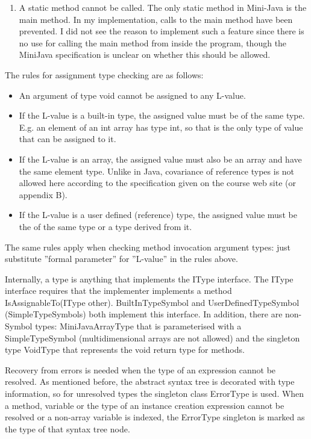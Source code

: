 \documentclass[a4paper,11pt]{article}
\begin{document}
\begin{enumerate}
\item A static method cannot be called. The only static method in Mini-Java is the main method. In my implementation, calls to the main method have been prevented. I did not see the reason to implement such a feature since there is no use for calling the main method from inside the program, though the MiniJava specification is unclear on whether this should be allowed.
\end{enumerate}

The rules for assignment type checking are as follows:
\begin{itemize}
\item An argument of type void cannot be assigned to any L-value.
\item If the L-value is a built-in type, the assigned value must be of the same type. E.g. an element of an int array has type int, so that is the only type of value that can be assigned to it.
\item If the L-value is an array, the assigned value must also be an array and have the same element type. Unlike in Java, covariance of reference types is not allowed here according to the specification given on the course web site (or appendix B).
\item If the L-value is a user defined (reference) type, the assigned value must be the of the same type or a type derived from it.
\end{itemize}

The same rules apply when checking method invocation argument types: just substitute ''formal parameter'' for ''L-value'' in the rules above.

Internally, a type is anything that implements the IType interface. The IType interface requires that the implementer implements a method IsAssignableTo(IType other). BuiltInTypeSymbol and UserDefinedTypeSymbol (SimpleTypeSymbols) both implement this interface. In addition, there are non-Symbol types: MiniJavaArrayType that is parameterised with a SimpleTypeSymbol (multidimensional arrays are not allowed) and the singleton type VoidType that represents the void return type for methods.

Recovery from errors is needed when the type of an expression cannot be resolved. As mentioned before, the abstract syntax tree is decorated with type information, so for unresolved types the singleton class ErrorType is used. When a method, variable or the type of an instance creation expression cannot be resolved or a non-array variable is indexed, the ErrorType singleton is marked as the type of that syntax tree node.
\end{document}
